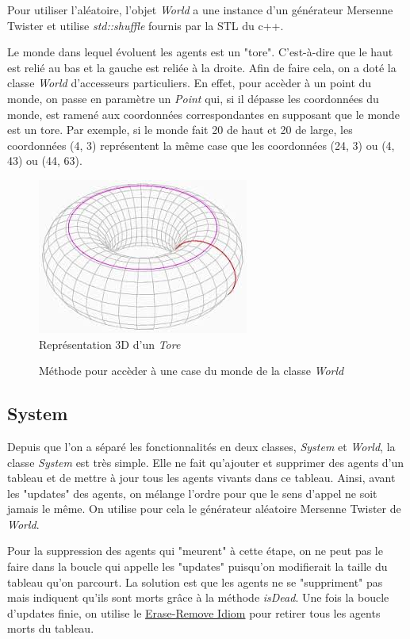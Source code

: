 \documentclass{article}
\begin{document}
Pour utiliser l'aléatoire, l'objet \emph{World} a une instance d'un générateur Mersenne Twister et utilise \emph{std::shuffle} fournis par la STL du c++.

Le monde dans lequel évoluent les agents est un "tore". C'est-à-dire que le haut est relié au bas et la gauche est reliée à la droite.
Afin de faire cela, on a doté la classe \emph{World} d'accesseurs particuliers. En effet, pour accèder à un point du monde, on passe
en paramètre un \emph{Point} qui, si il dépasse les coordonnées du monde, est ramené aux coordonnées correspondantes en supposant que le
monde est un tore. Par exemple, si le monde fait 20 de haut et 20 de large, les coordonnées (4, 3) représentent la même case que les
coordonnées (24, 3) ou (4, 43) ou (44, 63).
\begin{figure}[!h]
  \centering
  \caption{Représentation 3D d'un \emph{Tore}}
  \includegraphics[scale=1]{img/tore.jpeg}
\end{figure}
\begin{figure}[!h]
  \centering
  \caption{Méthode pour accèder à une case du monde de la classe \emph{World}}
  
\end{figure}

\subsection{System}
Depuis que l'on a séparé les fonctionnalités en deux classes, \emph{System} et \emph{World}, la classe \emph{System} est très simple.
Elle ne fait qu'ajouter et supprimer des agents d'un tableau et de mettre à jour tous les agents vivants
dans ce tableau.
Ainsi, avant les "updates" des agents, on mélange l'ordre pour que le sens d'appel ne soit jamais le même. On utilise pour cela le générateur
aléatoire Mersenne Twister de \emph{World}.

Pour la suppression des agents qui "meurent" à cette étape, on ne peut pas le faire dans la boucle qui appelle les "updates" puisqu'on
modifierait la taille du tableau qu'on parcourt. La solution est que les agents ne se "suppriment" pas mais indiquent qu'ils sont morts
grâce à la méthode \emph{isDead}. Une fois la boucle d'updates finie, on utilise le \href{https://en.wikipedia.org/wiki/Erase%E2%80%93remove_idiom}{Erase-Remove Idiom}
pour retirer tous les agents morts du tableau.
\end{document}

